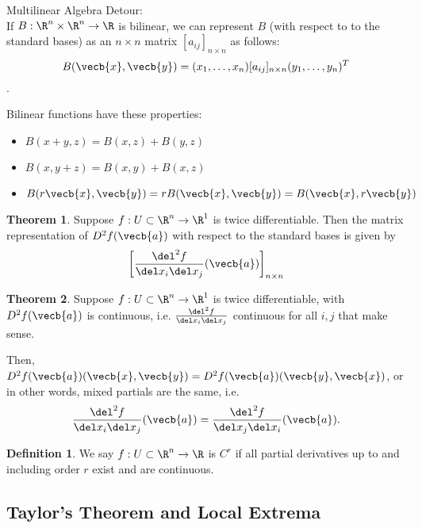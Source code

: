 \documentclass[a5paper]{article}
\theoremstyle{definition}%
\newtheorem{theorem}{Theorem}
\newtheorem*{definition*}{Definition}
\numberwithin{exercise}{section}
\theoremstyle{remark}%
\begin{document}
Multilinear Algebra Detour:\\
If $B:\R^n\times \R^n \to \R$ is bilinear, we can represent $B$ (with respect to to the standard bases) as an $n\times n$ matrix $[a_{ij}]_{n\times n}$ as follows: 
$$B(\vecb{x}, \vecb{y})=(x_1, \ldots, x_n)[a_{ij}]_{n\times n}(y_1, \ldots, y_n)^T$$. 

Bilinear functions have these properties:
\begin{itemize}
\item $B(x+y, z)=B(x,z)+B(y,z)$
\item $B(x,y+z)=B(x,y)+B(x,z)$
\item $B(r\vecb{x}, \vecb{y})= rB(\vecb{x}, \vecb{y})= B(\vecb{x}, r\vecb{y})$
\end{itemize}

\pagebreak
\begin{highlight}
\begin{theorem}
Suppose $f:U\subset \R^n\to \R^1$ is twice differentiable. Then the matrix representation  of $D^2f(\vecb{a})$ with respect to the standard bases is given by 
$$\left[\frac{\del^2f}{\del x_i \del x_j}(\vecb{a})\right]_{n\times n}$$
\end{theorem}
\end{highlight}

\begin{highlight}
\begin{theorem}
Suppose $f:U\subset \R^n\to \R^1$ is twice differentiable, with $D^2f(\vecb{a})$ is continuous, i.e. $\frac{\del^2f}{\del x_i \del x_j}$ continuous for all $i, j$ that make sense. 

Then, $D^2f(\vecb{a})(\vecb{x}, \vecb{y})=D^2f(\vecb{a})(\vecb{y}, \vecb{x})$, or in other words, mixed partials are the same, i.e.
$$\frac{\del^2f}{\del x_i \del x_j}(\vecb{a})=\frac{\del^2f}{\del x_j \del x_i}(\vecb{a}).$$
\end{theorem}
\end{highlight}


\begin{highlight}
\begin{definition*}
We say $f:U\subset \R^n\to \R$ is $C^r$ if all partial derivatives up to and including order $r$ exist and are continuous. 
\end{definition*}
\end{highlight}

\subsection{Taylor's Theorem and Local Extrema}
\end{document}
